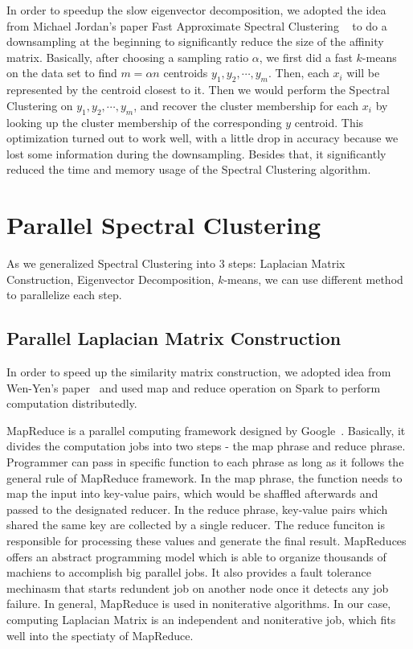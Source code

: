 \documentclass{acm_proc_article-sp}
\begin{document}
In order to speedup the slow eigenvector decomposition, we adopted the idea from Michael Jordan's paper Fast Approximate Spectral Clustering ~\cite{yan2009fast} to do a downsampling at the beginning to significantly reduce the size of the affinity matrix. Basically, after choosing a sampling ratio $\alpha$, we first did a fast $k$-means on the data set to find $m = \alpha n$ centroids $y_1, y_2, \cdots, y_m$. Then, each $x_i$ will be represented by the centroid closest to it. Then we would perform the Spectral Clustering on $y_1, y_2, \cdots, y_m$, and recover the cluster membership for each $x_i$ by looking up the cluster membership of the corresponding $y$ centroid. This optimization turned out to work well, with a little drop in accuracy because we lost some information during the downsampling. Besides that, it significantly reduced the time and memory usage of the Spectral Clustering algorithm.

\section{Parallel Spectral Clustering}
As we generalized Spectral Clustering into 3 steps: Laplacian Matrix Construction, Eigenvector Decomposition, $k$-means, we can use different method to parallelize each step.

\subsection{Parallel Laplacian Matrix Construction}
In order to speed up the similarity matrix construction, we adopted idea from Wen-Yen's paper~\cite{chen2011parallel} and used map and reduce operation on Spark to perform computation distributedly.

MapReduce is a parallel computing framework designed by Google~\cite{dean2008mapreduce}. Basically, it divides the computation jobs into two steps - the map phrase and reduce phrase. Programmer can pass in specific function to each phrase as long as it follows the general rule of MapReduce framework. In the map phrase, the function needs to map the input into key-value pairs, which would be shaffled afterwards and passed to the designated reducer. In the reduce phrase, key-value pairs which shared the same key are collected by a single reducer. The reduce funciton is responsible for processing these values and generate the final result. MapReduces offers an abstract programming model which is able to organize thousands of machiens to accomplish big parallel jobs. It also provides a fault tolerance mechinasm that starts redundent job on another node once it detects any job failure. In general, MapReduce is used in noniterative algorithms. In our case, computing Laplacian Matrix is an independent and noniterative job, which fits well into the spectiaty of MapReduce.
\end{document}
